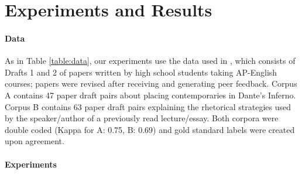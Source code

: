 \documentclass[11pt]{article}
\begin{document}
\section{Experiments and Results}
\paragraph{Data}
As in Table \ref{table:data}, our experiments use the data used in \cite{zhang-litman:2016:N16-1}, which consists of Drafts 1 and 2 of papers written by high school students taking AP-English courses; papers were revised after receiving and generating peer feedback. Corpus A contains 47 paper draft pairs about placing contemporaries in Dante's Inferno. Corpus B contains 63 paper draft pairs explaining the rhetorical strategies used by the speaker/author of a previously read lecture/essay. Both corpora were double coded (Kappa for A: 0.75, B: 0.69) and gold standard labels were created upon agreement. 




\paragraph{Experiments}
\end{document}
